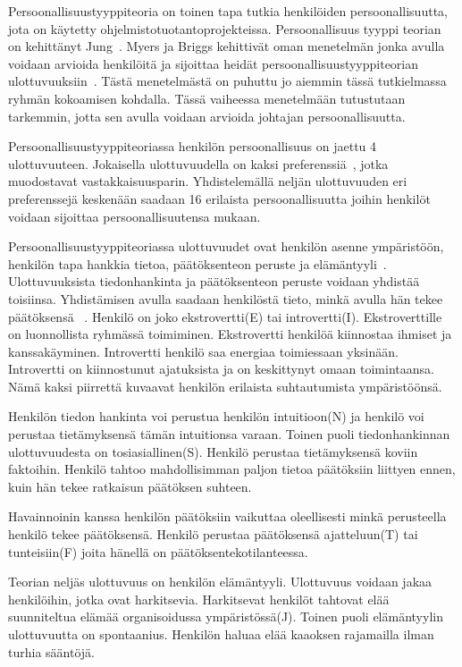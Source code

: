 \documentclass[finnish]{tktltiki2}
\theoremstyle{definition}
\theoremstyle{remark}
\begin{document}
Persoonallisuustyyppiteoria on toinen tapa tutkia henkilöiden persoonallisuutta, jota on käytetty ohjelmistotuotantoprojekteissa. Persoonallisuus tyyppi teorian on kehittänyt Jung~\cite{jung1989psychological}. Myers ja Briggs kehittivät oman menetelmän jonka avulla voidaan arvioida henkilöitä ja sijoittaa heidät persoonallisuustyyppiteorian ulottuvuuksiin~\cite{myers1985manual}. Tästä menetelmästä on puhuttu jo aiemmin tässä tutkielmassa ryhmän kokoamisen kohdalla. Tässä vaiheessa menetelmään tutustutaan tarkemmin, jotta sen avulla voidaan arvioida johtajan persoonallisuutta.

Persoonallisuustyyppiteoriassa henkilön persoonallisuus on jaettu 4 ulottuvuuteen. Jokaisella ulottuvuudella on kaksi preferenssiä~\cite{bradley1997effect}, jotka muodostavat vastakkaisuusparin. Yhdistelemällä neljän ulottuvuuden eri preferenssejä keskenään saadaan 16 erilaista persoonallisuutta joihin henkilöt voidaan sijoittaa persoonallisuutensa mukaan.

Persoonallisuustyyppiteoriassa ulottuvuudet ovat henkilön asenne ym\-pä\-ris\-töön, henkilön tapa hankkia tietoa, päätöksenteon peruste ja elämäntyyli~\cite{bradley1997effect}. Ulottuvuuksista tiedonhankinta ja päätöksenteon peruste voidaan yhdistää toisiinsa. Yhdistämisen avulla saadaan henkilöstä tieto, minkä avulla hän tekee päätöksensä ~\cite{bradley1997effect}.
Henkilö on joko ekstrovertti(E) tai introvertti(I). Ekstroverttille on luonnollista ryhmässä toimiminen. Ekstrovertti henkilöä kiinnostaa ihmiset ja kanssakäyminen. Introvertti henkilö saa energiaa toimiessaan yksinään. Introvertti on kiinnostunut ajatuksista ja on keskittynyt omaan toimintaansa. Nämä kaksi piirrettä kuvaavat henkilön erilaista suhtautumista ympäristöönsä.

Henkilön tiedon hankinta voi perustua henkilön intuitioon(N) ja henkilö voi perustaa tietämyksensä tämän intuitionsa varaan. Toinen puoli tiedonhankinnan ulottuvuudesta on tosiasiallinen(S). Henkilö perustaa tietämyksensä koviin faktoihin. Henkilö tahtoo mahdollisimman paljon tietoa päätöksiin liittyen ennen, kuin hän tekee ratkaisun päätöksen suhteen.

Havainnoinin kanssa henkilön päätöksiin vaikuttaa oleellisesti minkä perusteella henkilö tekee päätöksensä. Henkilö perustaa päätöksensä ajatteluun(T) tai tunteisiin(F) joita hänellä on päätöksentekotilanteessa.

Teorian neljäs ulottuvuus on henkilön elämäntyyli. Ulottuvuus voidaan jakaa henkilöihin, jotka ovat harkitsevia. Harkitsevat henkilöt tahtovat elää suunniteltua elämää organisoidussa ympäristössä(J). Toinen puoli elämäntyylin ulottuvuutta on spontaanius. Henkilön haluaa elää kaaoksen rajamailla ilman turhia sääntöjä.
   
\end{document}
